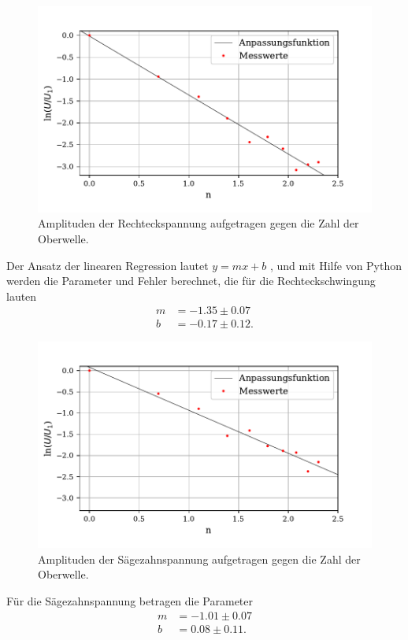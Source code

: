 \begin{figure}
  \centering
  \includegraphics{plot1.pdf}
  \caption{Amplituden der Rechteckspannung aufgetragen gegen die Zahl der Oberwelle.}
  \label{fig:rechteck}
\end{figure}
\noindent Der Ansatz der linearen Regression lautet $y = mx + b$ , und mit Hilfe von Python werden die Parameter und Fehler berechnet, die für die Rechteckschwingung lauten
\begin{align*}
  m &= -1.35 \pm 0.07 \\
  b &= -0.17 \pm 0.12 .
\end{align*}

\begin{figure}
  \centering
  \includegraphics{plot2.pdf}
  \caption{Amplituden der Sägezahnspannung aufgetragen gegen die Zahl der Oberwelle.}
  \label{fig:rechteck}
\end{figure}
Für die Sägezahnspannung betragen die Parameter
\begin{align*}
  m &= -1.01 \pm 0.07 \\
  b &= 0.08 \pm 0.11 .
\end{align*}


